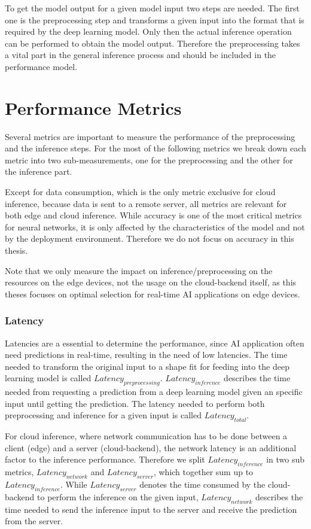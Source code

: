 To get the model output for a given model input two steps are needed. The first one is the preprocessing step and transforms a given input into the format that is required by the deep learning model. Only then the actual inference operation can be performed to obtain the model output. Therefore the preprocessing takes a vital part in the general inference process and should be included in the performance model.

\section{Performance Metrics}
\label{chap:metrics}
Several metrics are important to measure the performance of the preprocessing and the inference steps. For the most of the following metrics we break down each metric into two sub-measurements, one for the preprocessing  and the other for the inference part.

Except for data consumption, which is the only metric exclusive for cloud inference, because data is sent to a remote server, all metrics are relevant for both edge and cloud inference.
While accuracy is one of the most critical metrics for neural networks, it is only affected by the characteristics of the model and not by the deployment environment. Therefore we do not focus on accuracy in this thesis.

Note that we only measure the impact on inference/preprocessing on the resources on the edge devices, not the usage on the cloud-backend itself, as this theses focuses on optimal selection for real-time AI applications on edge devices.
\subsubsection{Latency}
Latencies are a essential to determine the performance, since AI application often need predictions in real-time, resulting in the need of low latencies.
The time needed to transform the original input to a shape fit for feeding into the deep learning model is called $Latency_{preprocessing}$.
$Latency_{inference}$ describes the time needed from requesting a prediction from a deep learning model given an specific input until getting the prediction.
The latency needed to perform both preprocessing and inference for a given input is called $Latency_{total}$.

For cloud inference, where network communication has to be done between a client (edge) and a server (cloud-backend), the network latency is an additional factor to the inference performance.
Therefore we split $Latency_{inference}$ in two sub metrics, $Latency_{network}$ and $Latency_{server}$, which together sum up to $Latency_{inference}$.
While $Latency_{server}$ denotes the time consumed by the cloud-backend to perform the inference on the given input, $Latency_{network}$ describes the time needed to send the inference input to the server and receive the prediction from the server.
